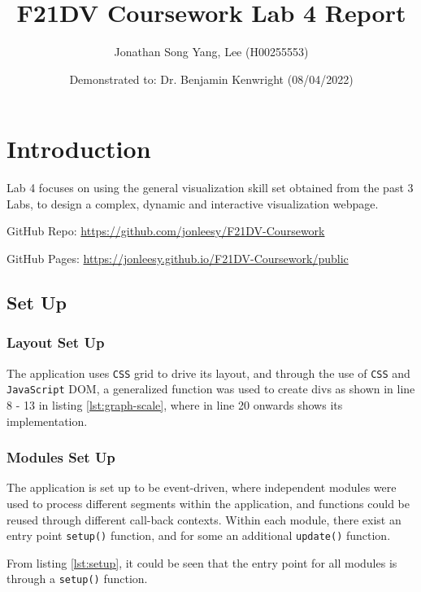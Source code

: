 \documentclass{scrreprt}
\title{F21DV Coursework Lab 4 Report}
\author{Jonathan Song Yang, Lee (H00255553)}
\date{Demonstrated to: Dr. Benjamin Kenwright (08/04/2022)}
\begin{document}


\maketitle

\newpage
\tableofcontents



\newpage
\chapter{Introduction}
Lab 4 focuses on using the general visualization skill set obtained from the past 3 Labs, to design a complex, dynamic and interactive visualization webpage. 
\par GitHub Repo: \href{https://github.com/jonleesy/F21DV-Coursework}{https://github.com/jonleesy/F21DV-Coursework}
\par GitHub Pages: \href{https://jonleesy.github.io/F21DV-Coursework/public}{https://jonleesy.github.io/F21DV-Coursework/public}

\section{Set Up}
\subsection{Layout Set Up}
The application uses \verb|CSS| grid to drive its layout, and through the use of \verb|CSS| and \verb|JavaScript| DOM, a generalized function was used to create divs as shown in line 8 - 13 in listing \ref{lst:graph-scale}, where in line 20 onwards shows its implementation. 


\subsection{Modules Set Up}
The application is set up to be event-driven, where independent modules were used to process different segments within the application, and functions could be reused through different call-back contexts. Within each module, there exist an entry point \verb|setup()| function, and for some an additional \verb|update()| function. 

From listing \ref{lst:setup}, it could be seen that the entry point for all modules is through a \verb|setup()| function. 
\end{document}
